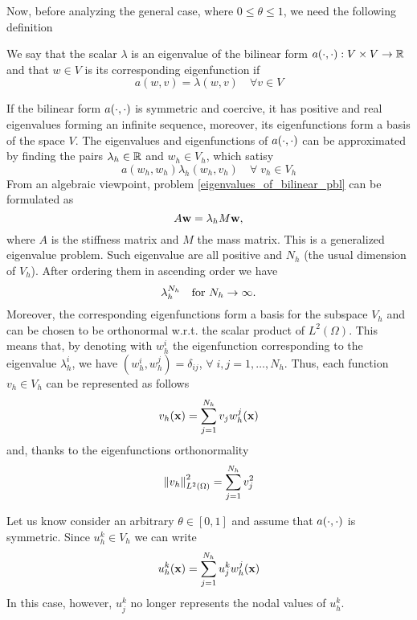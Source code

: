 Now, before analyzing the general case, where \(0 \leq \theta \leq 1\), we need the following definition 
\begin{definition}
    We say that the scalar \(\lambda\) is an eigenvalue of the bilinear form \(a(\cdot, \cdot): V \times V \to \mathbb{R}\) and that \(w \in V\) is its corresponding eigenfunction if 
    \[
        a(w,v) = \lambda(w,v) \quad \forall v \in V    
    \]
\end{definition}
If the bilinear form \(a(\cdot, \cdot)\) is symmetric and coercive, it has positive and real eigenvalues forming an infinite sequence, moreover, its eigenfunctions form a basis of the space \(V\). The eigenvalues and eigenfunctions of \(a(\cdot, \cdot)\) can be approximated by finding the pairs \(\lambda_h \in \mathbb{R}\) and \(w_h \in V_h\), which satisy 
\begin{equation}
    a(w_h, w_h) \lambda_h (w_h, v_h) \quad \forall \; v_h \in V_h
    \label{eigenvalues_of_bilinear_pbl}
\end{equation}
From an algebraic viewpoint, problem \eqref{eigenvalues_of_bilinear_pbl} can be formulated as 
\[
    A\textbf{w} = \lambda_h M \textbf{w},
\]
where \(A\) is the stiffness matrix and \(M\) the mass matrix. This is a generalized eigenvalue problem. Such eigenvalue are all positive and \(N_h\) (the usual dimension of \(V_h\)). After ordering them in ascending order we have
\[
    \lambda_h^{N_h} \quad \text{for } N_h \to \infty.
\]
Moreover, the corresponding eigenfunctions form a basis for the subspace \(V_h\) and can be chosen to be orthonormal w.r.t. the scalar product of \(L^2(\Omega)\). This means that, by denoting with \(w^i_h\) the eigenfunction corresponding to the eigenvalue \(\lambda^i_h\), we have \((w^i_h, w_h^j) = \delta_{ij}\), \(\forall \; i,j = 1,\ldots,N_h\). Thus, each function \(v_h \in V_h\) can be represented as follows 
\[
    v_h(\textbf{x}) = \sum_{j=1}^{N_h} v_j w^j_h(\textbf{x})
\]
and, thanks to the eigenfunctions orthonormality
\begin{equation}
    \norm{v_h}_{L^2(\Omega)}^2 = \sum_{j=1}^{N_h} v_j^2
    \label{orthonormality_pbl}
\end{equation}

Let us know consider an arbitrary \(\theta \in [0,1]\) and assume that \(a(\cdot, \cdot)\) is symmetric. Since \(u_h^k \in V_h\) we can write 
\[
    u_h^k(\textbf{x}) = \sum_{j=1}^{N_h} u^k_j w^j_h(\textbf{x})
\]
In this case, however, \(u_j^k\) no longer represents the nodal values of \(u_h^k\).

